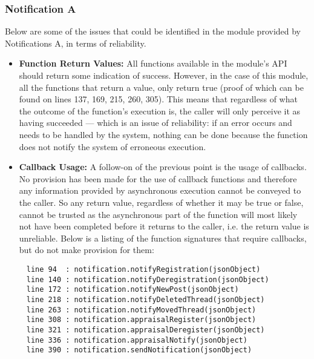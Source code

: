 
\subsubsection*{Notification A}
Below are some of the issues that could be identified in the module provided by Notifications A, in terms of reliability.
\begin{itemize}
    \item \textbf{Function Return Values:}\newline
     All functions available in the module's API should return some indication of success.
     However, in the case of this module, all the functions that return a value, only return true (proof of which can be found on lines 137, 169, 215, 260, 305). This means that 
     regardless of what the outcome of the function's execution is, the caller will only perceive it as 
     having succeeded --- which is an issue of reliability: if an error occurs and needs to be handled by the system, 
     nothing can be done because the function does not notify the system of erroneous execution.
     \item \textbf{Callback Usage:}\newline
     A follow-on of the previous point is the usage of callbacks.
     No provision has been made for the use of callback functions and therefore any 
     information provided by asynchronous execution cannot be conveyed to the caller. So any return value, regardless of whether it may be true or false, cannot be trusted as the asynchronous part of the function will most likely not have been completed before it returns to the caller, i.e. the return value is unreliable.\newline
     Below is a listing of the function signatures that require callbacks, but do not make provision for them:
\end{itemize}
\begin{lstlisting}
     line 94  : notification.notifyRegistration(jsonObject)
     line 140 : notification.notifyDeregistration(jsonObject)
     line 172 : notification.notifyNewPost(jsonObject)
     line 218 : notification.notifyDeletedThread(jsonObject)
     line 263 : notification.notifyMovedThread(jsonObject)
     line 308 : notification.appraisalRegister(jsonObject)
     line 321 : notification.appraisalDeregister(jsonObject)
     line 336 : notification.appraisalNotify(jsonObject)
     line 390 : notification.sendNotification(jsonObject)
\end{lstlisting}
   
